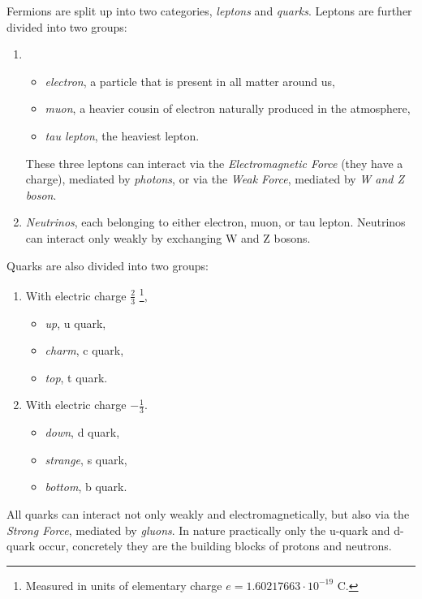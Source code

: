 Fermions are split up into two categories, \emph{leptons} and \emph{quarks}. 
Leptons are further divided into two groups:
\begin{enumerate}
    \item  
    \begin{itemize}
        \item \emph{electron}, a particle that is present in all matter around us,
        \item \emph{muon}, a heavier cousin of electron naturally produced in the atmosphere,
        \item \emph{tau lepton}, the heaviest lepton.
    \end{itemize}
    These three leptons can interact via the \emph{Electromagnetic Force} (they have a charge), mediated by \emph{photons}, or via the \emph{Weak Force}, mediated by \emph{W and Z boson}. 
    \item \emph{Neutrinos}, each belonging to either electron, muon, or tau lepton.  
    Neutrinos can interact only weakly by exchanging W and Z bosons.
\end{enumerate}
Quarks are also divided into two groups:
\begin{multicols}{2}
\begin{enumerate}
    \item  
    With electric charge $\frac{2}{3}$ \footnote{Measured in units of elementary charge $e=1.60217663\cdot10^{-19}$ C.},
    \begin{itemize}
        \item \emph{up}, u quark,
        \item \emph{charm}, c quark,
        \item \emph{top}, t quark.
    \end{itemize}
    \item  
    With electric charge $-\frac{1}{3}$.
    \begin{itemize}
        \item \emph{down}, d quark,
        \item \emph{strange}, s quark,
        \item \emph{bottom}, b quark.
    \end{itemize}
\end{enumerate}
\end{multicols}
All quarks can interact not only weakly and electromagnetically, but also via the \emph{Strong Force}, mediated by \emph{gluons}.
In nature practically only the u-quark and d-quark occur, concretely they are the building blocks of protons and neutrons.

